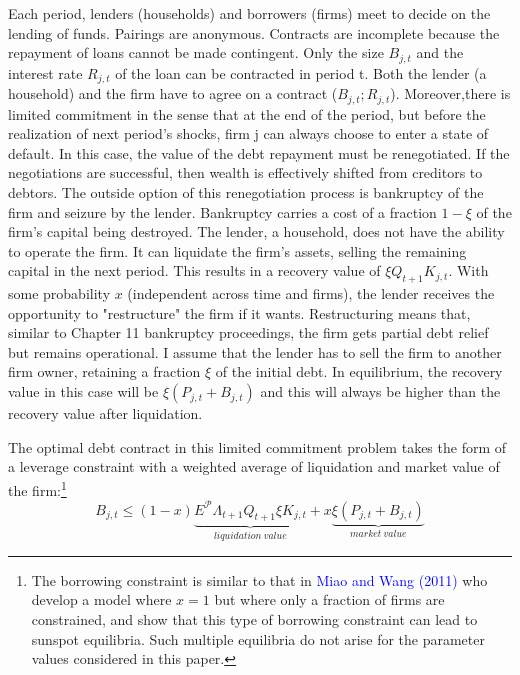 \documentclass[10pt,math=newtx,citestyle=gb7714-2015,bibstyle=gb7714-2015]{elegantbook}
\begin{document}
{{{			Each period, lenders (households) and borrowers (firms) meet to decide on the lending of funds. Pairings are anonymous. Contracts are incomplete because the repayment of loans cannot be made contingent. Only the size $B_{j,t}$ and the interest rate $R_{j,t}$ of the loan can be contracted in period t. Both the lender (a household) and the firm have to agree on a contract ($B_{j,t};R_{j,t}$). Moreover,there is limited commitment in the sense that at the end of the period, but before the realization of next period's shocks, firm j can always choose to enter a state of default. In this case, the value of the debt repayment must be renegotiated. If the negotiations are successful, then wealth is effectively shifted from creditors to debtors. The outside option of this renegotiation process is bankruptcy of the firm and seizure by the lender. Bankruptcy carries a cost of a fraction $1-\xi$ of the firm's capital being destroyed. The lender, a household, does not have the ability to operate the firm. It can liquidate the firm's assets, selling the remaining capital in the next period. This results in a recovery value of $\xi Q_{t+1}K_{j,t}$. With some probability $x$ (independent across time and firms), the lender receives the opportunity to "restructure" the firm if it wants. Restructuring means that, similar to Chapter 11 bankruptcy proceedings, the firm gets partial debt relief but remains operational. I assume that the lender has to sell the firm to another firm owner, retaining a fraction $\xi$ of the initial debt. In equilibrium, the recovery value in this case will be $\xi (P_{j,t} + B_{j,t})$
			and this will always be higher than the recovery value after liquidation.
			
			The optimal debt contract in this limited commitment problem takes the form of a leverage constraint with a weighted average of liquidation and market value of
			the firm:\footnote{The borrowing constraint is similar to that in \textcolor{blue}{Miao and Wang (2011)} who develop a model where $x = 1$ but where only a fraction of firms are constrained, and show that this type of borrowing constraint can lead to sunspot equilibria. Such multiple equilibria do not arise for the parameter values considered in this paper.}
			\begin{equation}
				B_{j,t} \le (1 - x) \underbrace{\mathit{E}^{\mathcal{P}}\Lambda_{t+1}{Q_{t+1}\xi K_{j,t}}}_{liquidation ~value}+x \underbrace{\xi (P_{j,t} + B_{j,t})}_{market~ value}
			\end{equation}
			
}}}
\end{document}
